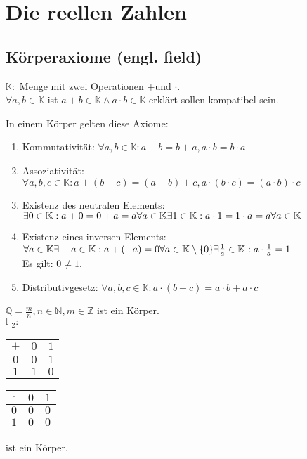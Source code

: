 \documentclass[../ana1.tex]{subfiles}
\begin{document}
\section{Die reellen Zahlen}
\subsection{Körperaxiome (engl. field)}
$\mathbb{K:}$ Menge mit zwei Operationen \glqq $+$\grqq und \glqq $\cdot$\grqq.\\
$\forall a,b \in \mathbb{K}$ ist $a+b\in \mathbb{K} \wedge a\cdot b \in \mathbb{K}$ erklärt sollen kompatibel sein.
\begin{defi}[Körperaxiome]
	In einem Körper gelten diese Axiome:
	\begin{enumerate}
		\item Kommutativität: $\forall a,b\in \mathbb{K}: a+b=b+a, a\cdot b=b\cdot a$
		\item Assoziativität: $\forall a,b,c\in \mathbb{K}: a+(b+c) = (a+b)+c, a\cdot (b\cdot c) = (a\cdot b)\cdot c$
		\item Existenz des neutralen Elements: \\
		      $\exists 0 \in \mathbb{K}: a + 0 = 0 + a = a\forall a\in \mathbb{K}\\
			      \exists 1 \in \mathbb{K}: a \cdot 1 = 1 \cdot a = a \forall a\in\mathbb{K}$
		\item Existenz eines inversen Elements:\\
		      $\forall a\in\mathbb{K}\exists -a\in\mathbb{K}:a+ (-a)=0\\
			      \forall a\in\mathbb{K}\setminus\{0\}\exists \frac{1}{a}\in\mathbb{K}:a\cdot\frac{1}{a}=1$\\
		      Es gilt: $0 \neq 1$.
		\item Distributivgesetz: $\forall a,b,c\in\mathbb{K}:a\cdot(b+c)=a\cdot b + a \cdot c$
	\end{enumerate}
\end{defi}
\begin{bsp}
	$\mathbb{Q} = \frac{m}{n}, n \in \mathbb{N}, m\in\mathbb{Z}$ ist ein Körper.\\
	$\mathbb{F}_2: $
	\begin{tabular}{c|cc}
		$+$ & $0$ & $1$ \\
		\hline
		$0$ & $0$ & $1$ \\
		$1$ & $1$ & $0$
	\end{tabular}
	\begin{tabular}{c|cc}
		$\cdot$ & $0$ & $1$ \\
		\hline
		$0$     & $0$ & $0$ \\
		$1$     & $0$ & $0$
	\end{tabular}
	ist ein Körper.
\end{bsp}
\end{document}
